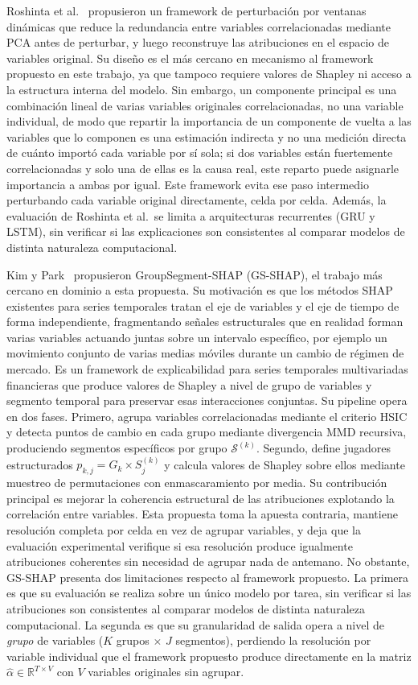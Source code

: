 \documentclass[conference, letterpaper]{IEEEtran}
\begin{document}
Roshinta et al.~\cite{roshinta2026} propusieron un framework de perturbación por ventanas dinámicas que reduce la redundancia entre variables correlacionadas mediante PCA antes de perturbar, y luego reconstruye las atribuciones en el espacio de variables original. Su diseño es el más cercano en mecanismo al framework propuesto en este trabajo, ya que tampoco requiere valores de Shapley ni acceso a la estructura interna del modelo. Sin embargo, un componente principal es una combinación lineal de varias variables originales correlacionadas, no una variable individual, de modo que repartir la importancia de un componente de vuelta a las variables que lo componen es una estimación indirecta y no una medición directa de cuánto importó cada variable por sí sola; si dos variables están fuertemente correlacionadas y solo una de ellas es la causa real, este reparto puede asignarle importancia a ambas por igual. Este framework evita ese paso intermedio perturbando cada variable original directamente, celda por celda. Además, la evaluación de Roshinta et al.\ se limita a arquitecturas recurrentes (GRU y LSTM), sin verificar si las explicaciones son consistentes al comparar modelos de distinta naturaleza computacional.

Kim y Park~\cite{gsshap2026} propusieron GroupSegment-SHAP (GS-SHAP), el trabajo más cercano en dominio a esta propuesta. Su motivación es que los métodos SHAP existentes para series temporales tratan el eje de variables y el eje de tiempo de forma independiente, fragmentando señales estructurales que en realidad forman varias variables actuando juntas sobre un intervalo específico, por ejemplo un movimiento conjunto de varias medias móviles durante un cambio de régimen de mercado. Es un framework de explicabilidad para series temporales multivariadas financieras que produce valores de Shapley a nivel de grupo de variables y segmento temporal para preservar esas interacciones conjuntas. Su pipeline opera en dos fases. Primero, agrupa variables correlacionadas mediante el criterio HSIC y detecta puntos de cambio en cada grupo mediante divergencia MMD recursiva, produciendo segmentos específicos por grupo $\mathcal{S}^{(k)}$. Segundo, define jugadores estructurados $p_{k,j} = G_k \times S_j^{(k)}$ y calcula valores de Shapley sobre ellos mediante muestreo de permutaciones con enmascaramiento por media. Su contribución principal es mejorar la coherencia estructural de las atribuciones explotando la correlación entre variables. Esta propuesta toma la apuesta contraria, mantiene resolución completa por celda en vez de agrupar variables, y deja que la evaluación experimental verifique si esa resolución produce igualmente atribuciones coherentes sin necesidad de agrupar nada de antemano. No obstante, GS-SHAP presenta dos limitaciones respecto al framework propuesto. La primera es que su evaluación se realiza sobre un único modelo por tarea, sin verificar si las atribuciones son consistentes al comparar modelos de distinta naturaleza computacional. La segunda es que su granularidad de salida opera a nivel de \emph{grupo} de variables ($K$ grupos $\times$ $J$ segmentos), perdiendo la resolución por variable individual que el framework propuesto produce directamente en la matriz $\hat{\alpha} \in \mathbb{R}^{T \times V}$ con $V$ variables originales sin agrupar.
\end{document}
